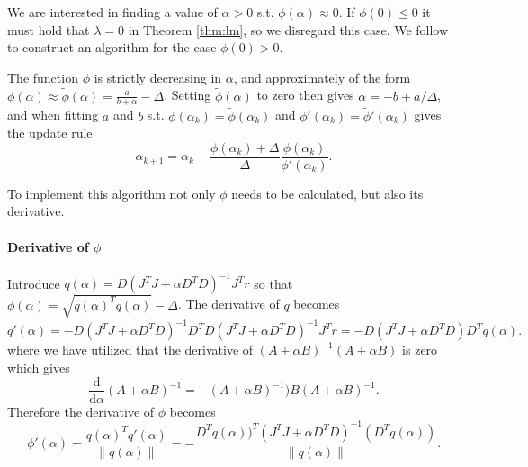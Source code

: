 We are interested in finding a value of $\alpha > 0$ s.t. $\phi(\alpha) \approx 0$. If $\phi(0) \leq 0$ it must hold that $\lambda = 0$ in Theorem \ref{thm:lm}, so we disregard this case. We follow \cite{watson_levenberg-marquardt_1978} to construct an algorithm for the case $\phi(0) > 0$.

The function $\phi$ is strictly decreasing in $\alpha$, and approximately of the form $\phi(\alpha) \approx \tilde \phi(\alpha) = \frac{a}{b + \alpha} - \Delta$. Setting $\tilde \phi(\alpha)$ to zero then gives $\alpha = -b + a / \Delta$, and when fitting $a$ and $b$ s.t. $\phi(\alpha_{k}) = \tilde \phi(\alpha_{k})$ and $\phi'(\alpha_{k}) = \tilde \phi'(\alpha_{k})$ gives the update rule
\begin{equation}
  \alpha_{k+1} = \alpha_{k} - \frac{\phi(\alpha_{k}) + \Delta}{\Delta} \frac{\phi(\alpha_{k})}{\phi'(\alpha_{k})}.
\end{equation}

To implement this algorithm not only $\phi$ needs to be calculated, but also its derivative.

\paragraph{Derivative of $\phi$} Introduce $q(\alpha) = D (J^{T} J + \alpha D^{T} D)^{-1} J^{T} r$ so that $\phi(\alpha) = \sqrt{q(\alpha)^{T} q(\alpha)} - \Delta$. The derivative of $q$ becomes
\begin{equation}
  q'(\alpha) = -D (J^{T} J + \alpha D^{T} D)^{-1} D^{T} D (J^{T} J + \alpha D^{T} D)^{-1} J^{T} r = -D (J^{T} J + \alpha D^{T} D) D^{T} q(\alpha).
\end{equation}
where we have utilized that the derivative of $(A + \alpha B)^{-1} (A + \alpha B)$ is zero which gives
\begin{equation}
  \frac{\mathrm{d}}{\mathrm{d}\alpha} (A + \alpha B)^{-1} = - (A + \alpha B)^{-1}) B (A + \alpha B)^{{-1}}.
\end{equation}
Therefore the derivative of $\phi$ becomes
\begin{equation}
  \phi'(\alpha) = \frac{q(\alpha)^{T} q'(\alpha)}{\| q(\alpha) \|} = -\frac{D^{T}q(\alpha))^{T} (J^{T} J + \alpha D^{T} D)^{-1} (D^{T} q(\alpha))}{\| q(\alpha) \|}.
\end{equation}


